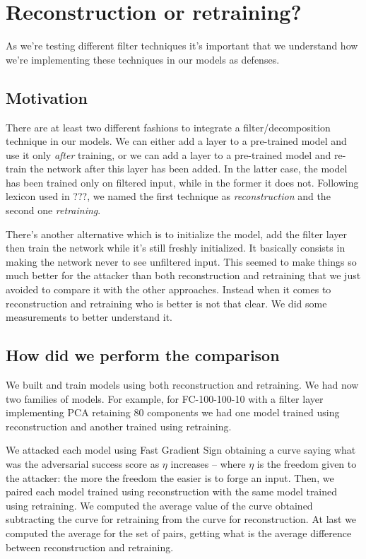 \chapter{Reconstruction or retraining?}

As we're testing different filter techniques it's important that we
understand how we're implementing these techniques in our models as
defenses.

\section{Motivation}
\label{sec:motivation}
There are at least two different fashions to integrate a
filter/decomposition technique in our models. We can either add a layer
to a pre-trained model and use it only \emph{after} training, or we can
add a layer to a pre-trained model and re-train the network after this
layer has been added. In the latter case, the model has been trained
only on filtered input, while in the former it does not. Following
lexicon used in ???, we named the first technique as
\emph{reconstruction} and the second one \emph{retraining}.

There's another alternative which is to initialize the model, add the
filter layer then train the network while it's still freshly
initialized. It basically consists in making the network never to see
unfiltered input. This seemed to make things so much better for the
attacker than both reconstruction and retraining that we just avoided
to compare it with the other approaches. Instead when it comes to
reconstruction and retraining who is better is not that clear. We did
some measurements to better understand it.

\section{How did we perform the comparison}

We built and train models using both reconstruction and retraining. We
had now two families of models. For example, for FC-100-100-10 with a
filter layer implementing PCA retaining 80 components we had one model
trained using reconstruction and another trained using retraining.

We attacked each model using Fast Gradient Sign obtaining a curve
saying what was the adversarial success score as $\eta$ increases --
where $\eta$ is the freedom given to the attacker: the more the freedom
the easier is to forge an input. Then, we paired each model trained
using reconstruction with the same model trained using retraining. We
computed the average value of the curve obtained subtracting the curve
for retraining from the curve for reconstruction. At last we computed
the average for the set of pairs, getting what is the average difference
between reconstruction and retraining.

